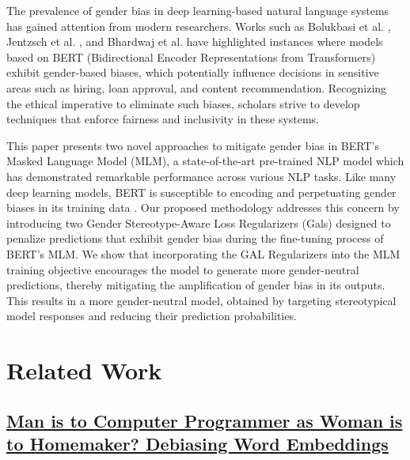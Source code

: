 \documentclass[10pt,twocolumn,letterpaper]{article}
\begin{document}
The prevalence of gender bias in deep learning-based natural language systems has gained attention from modern researchers.
Works such as Bolukbasi et al. \cite{biased-bert-embeddings}, Jentzsch et al. \cite{bias-measure}, and Bhardwaj et al. \cite{bert-bias-investiagion} have highlighted instances where models based on BERT (Bidirectional Encoder Representations from Transformers) exhibit gender-based biases, which potentially influence decisions in sensitive areas such as hiring, loan approval, and content recommendation.
Recognizing the ethical imperative to eliminate such biases, scholars strive to develop techniques that enforce fairness and inclusivity in these systems.

This paper presents two novel approaches to mitigate gender bias in BERT's Masked Language Model (MLM), a state-of-the-art pre-trained NLP model which has demonstrated remarkable performance across various NLP tasks.
Like many deep learning models, BERT is susceptible to encoding and perpetuating gender biases in its training data \cite{bert-bias-structure}.
Our proposed methodology addresses this concern by introducing two Gender Stereotype-Aware Loss Regularizers (Gals) designed to penalize predictions that exhibit gender bias during the fine-tuning process of BERT's MLM.
We show that incorporating the GAL Regularizers into the MLM training objective encourages the model to generate more gender-neutral predictions, thereby mitigating the amplification of gender bias in its outputs.
This results in a more gender-neutral model, obtained by targeting stereotypical model responses and reducing their prediction probabilities.

\section{Related Work}
\label{sec:relatedwork}

\subsection{\href{https://arxiv.org/abs/1607.06520}{Man is to Computer Programmer as Woman is to Homemaker? Debiasing Word Embeddings}}
\end{document}

